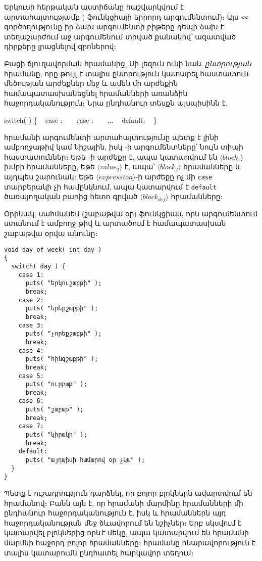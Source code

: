 Երկուսի հերթական  աստիճանը հաշվարկվում է 
արտահայտությամբ ( ֆունկցիայի երրորդ արգումենտում)։ Այս
\verb|<<| գործողությունը իր ձախ արգումենտի բիթերը դեպի ձախ է տեղաշարժում
աջ արգումենում տրված քանակով՝ ազատված դիրքերը լրացնելով զրոներով։

\medskip
Բացի  ճյուղավորման հրամանից, Սի լեզուն ունի նաև
 \emph{ընտրության} հրամանը, որը թույլ է տալիս ընտրություն
կատարել հաստատուն մեծության արժեքներ մեջ և ամեն մի արժեքին համապատասխանեցնել
հրամանների առանձին հաջորդականություն։ Նրա ընդհանուր տեսքն այսպիսինն է.

\begin{syntax}
switch(  ) \{
~ case :
~   
~ case :
~   
~ ...
~ default:
~   
\}
\end{syntax}

 հրամանի արգումենտի  արտահայտությունը
պետք է լինի ամբողջաթիվ կամ նիշային, իսկ -ի արգումենտները՝
նույն տիպի հաստատուններ։ Եթե -ի արժեքը 
է, ապա կատարվում են \(\langle block_1\rangle\) խմբի հրամանները, եթե
\(\langle value_2\rangle\) է, ապա՝ \(\langle block_2\rangle\) հրամանները
և այդպես շարունակ։ Եթե \(\langle expression\rangle\)-ի արժեքը ոչ մի
\texttt{case} տարբերակի չի համընկնում, ապա կատարվում է \texttt{default}
ծառայողական բառից հետո գրված \(\langle block_{def}\rangle\) հրամանները։

Օրինակ, սահմանեմ  (շաբաթվա օր) ֆունկցիան, որն
արգումենտում ստանում է ամբողջ թիվ և արտածում է համապատասխան շաբաթվա
օրվա անունը։

\begin{Verbatim}
void day_of_week( int day )
{
  switch( day ) {
    case 1:
      puts( "երկուշաբթի" );
      break;
    case 2:
      puts( "երեքշաբթի" );
      break;
    case 3:
      puts( "չորեքշաբթի" );
      break;
    case 4:
      puts( "հինգշաբթի" );
      break;
    case 5:
      puts( "ուրբաթ" );
      break;
    case 6:
      puts( "շաբաթ" );
      break;
    case 7:
      puts( "կիրակի" );
      break;
    default:
      puts( "այդպիսի համարով օր չկա" );
  }
}
\end{Verbatim}

Պետք է ուշադրություն դարձնել, որ բոլոր  բլոկներն ավարտվում
են  հրամանով։ Բանն այն է, որ  հրամանի մարմինը
հրամանների մի ընդհանուր հաջորդականություն է, իսկ  և
 հրամաններն այդ հաջորդականության մեջ ձևավորում են նշիչներ։
Երբ սկսվում է կատարվել բլոկներից որևէ մեկը, ապա կատարվում են 
հրամանի մարմնի հաջորդ բոլոր հրամանները։  հրամանը հնարավորություն
է տալիս կատարումն ընդհատել հարկավոր տեղում։

